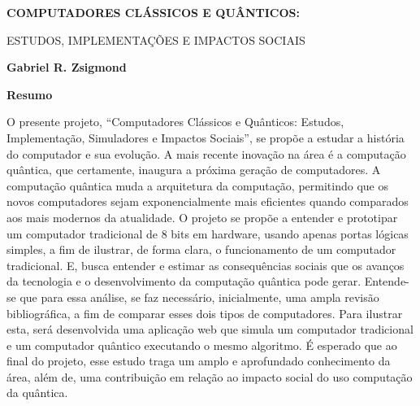 \thispagestyle{plain}
\begin{center}
    \Large
    \textbf{COMPUTADORES CLÁSSICOS E QUÂNTICOS:}
    
    \vspace{0.2cm}
    \large
    ESTUDOS, IMPLEMENTAÇÕES E IMPACTOS SOCIAIS
    
    \vspace{0.2cm}
    \textbf{Gabriel R. Zsigmond}
    
    \vspace{0.4cm}
    \textbf{Resumo}
\end{center}
O presente projeto, ``Computadores Clássicos e Quânticos: Estudos, Implementação, Simuladores e Impactos Sociais'', se propõe a estudar a história do computador e sua evolução. A mais recente inovação na área é a computação quântica, que certamente, inaugura a próxima geração de computadores. A computação quântica muda a arquitetura da computação, permitindo que os novos computadores sejam exponencialmente mais eficientes quando comparados aos mais modernos da atualidade. O projeto se propõe a entender e prototipar um computador tradicional de 8 bits em hardware, usando apenas portas lógicas simples, a fim de ilustrar, de forma clara, o funcionamento de um computador tradicional. E, busca entender e estimar as consequências sociais que os avanços da tecnologia e o desenvolvimento da computação quântica pode gerar. Entende-se que para essa análise, se faz necessário, inicialmente, uma ampla revisão bibliográfica, a fim de comparar esses dois tipos de computadores. Para ilustrar esta, será desenvolvida uma aplicação web que simula um computador tradicional e um computador quântico executando o mesmo algoritmo. É esperado que ao final do projeto, esse estudo traga um amplo e aprofundado conhecimento da área, além de, uma contribuição em relação ao impacto social do uso computação da quântica.